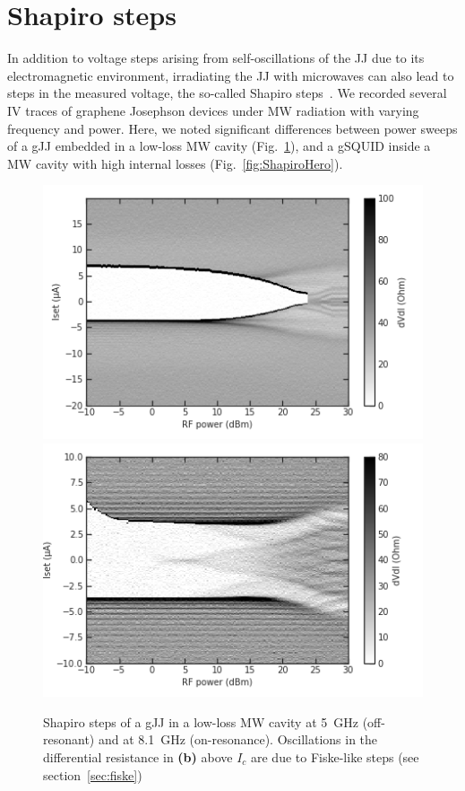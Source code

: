 \section{Shapiro steps}\label{sec:shapiro}

In addition to voltage steps arising from self-oscillations of the JJ due to its electromagnetic environment, irradiating the JJ with microwaves can also lead to steps in the measured voltage, the so-called Shapiro steps~\cite{shapiroJosephsonCurrentsSuperconducting1963,kautzNoiseChaosJosephson1996,tinkhamIntroductionSuperconductivity1996,heerscheBipolarSupercurrentGraphene2007a,leeUltimatelyShortBallistic2015,shellyExistenceShapiroSteps2020,larsonZerobiasCrossingsPeculiar2020}.
%
We recorded several IV traces of graphene Josephson devices under MW radiation with varying frequency and power.
%
Here, we noted significant differences between power sweeps of a gJJ embedded in a low-loss MW cavity (Fig.~\ref{fig:Shapiro2x1}), and a gSQUID inside a MW cavity with high internal losses (Fig.~\ref{fig:ShapiroHero}).

\begin{figure}
	\centering
	\includegraphics[width=0.45\linewidth]{appendix/gJJ-misc-figs/processing_Shapiro_2x1_5GHz}
	\hfill
	\includegraphics[width=0.45\linewidth]{appendix/gJJ-misc-figs/processing_Shapiro_2x1_onres}
	\caption{
		Shapiro steps of a gJJ in a low-loss MW cavity at \SI{5}{\giga\hertz} (off-resonant) and at \SI{8.1}{\giga\hertz} (on-resonance).
		Oscillations in the differential resistance in \textbf{(b)} above $I_c$ are due to Fiske-like steps (see section~\ref{sec:fiske})
	}
	\label{fig:Shapiro2x1}
\end{figure}

